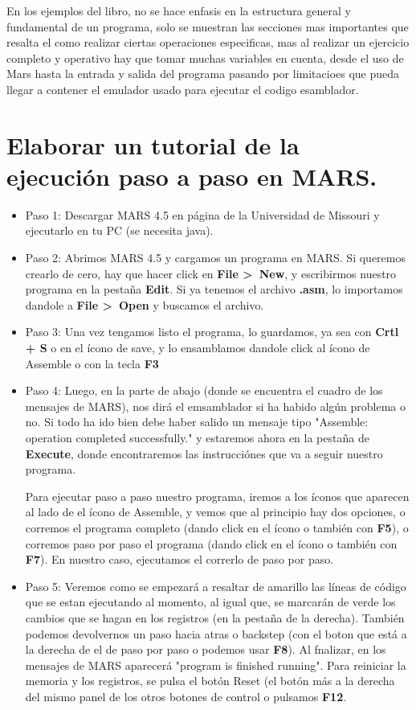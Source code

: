\documentclass{article}
\begin{document}
En los ejemplos del libro, no se hace enfasis en la estructura general y fundamental de  un programa, solo se muestran las secciones mas importantes que resalta el como realizar ciertas operaciones especificas, mas al realizar un ejercicio completo y operativo hay que tomar muchas variables en cuenta, desde el uso de Mars hasta la entrada y salida del programa pasando por limitacioes que pueda llegar a contener el emulador usado para ejecutar el codigo esamblador.

\section{Elaborar un tutorial de la ejecución paso a paso en MARS.}
\begin{itemize}
\item Paso 1: Descargar MARS 4.5 en página de la Universidad de Missouri y ejecutarlo en tu PC (se necesita java).
\item Paso 2: Abrimos MARS 4.5 y cargamos un programa en MARS. Si queremos crearlo de cero, hay que hacer click en \textbf{File \textgreater\ New}, y escribirmos nuestro programa en la pestaña \textbf{Edit}. Si ya tenemos el archivo \textbf{.asm}, lo importamos dandole a \textbf{File \textgreater\ Open} y buscamos el archivo.
\item Paso 3: Una vez tengamos listo el programa, lo guardamos, ya sea con \textbf{Crtl + S} o en el ícono de save, y lo ensamblamos dandole click al ícono de Assemble o con la tecla \textbf{F3}
\item Paso 4: Luego, en la parte de abajo (donde se encuentra el cuadro de los mensajes de MARS), nos dirá el emsamblador si ha habido algún problema o no. Si todo ha ido bien debe haber salido un mensaje tipo "Assemble: operation completed successfully." y estaremos ahora en la pestaña de \textbf{Execute}, donde encontraremos las instrucciónes que va a seguir nuestro programa.

Para ejecutar paso a paso nuestro programa, iremos a los íconos que aparecen al lado de el ícono de Assemble, y vemos que al principio hay dos opciones, o corremos el programa completo (dando click en el ícono o también con \textbf{F5}), o corremos paso por paso el programa (dando click en el ícono o también con \textbf{F7}). En nuestro caso, ejecutamos el correrlo de paso por paso.

\item Paso 5: Veremos como se empezará a resaltar de amarillo las líneas de código que se estan ejecutando al momento, al igual que, se marcarán de verde los cambios que se hagan en los registros (en la pestaña de la derecha). También podemos devolvernos un paso hacia atras o backstep (con el boton que está a la derecha de el de paso por paso o podemos usar \textbf{F8}). Al fnalizar, en los mensajes de MARS aparecerá "program is finished running". Para reiniciar la memoria y los registros, se pulsa el botón Reset (el botón más a la derecha del mismo panel de los otros botones de control o pulsamos \textbf{F12}.
\end{itemize}
\end{document}
